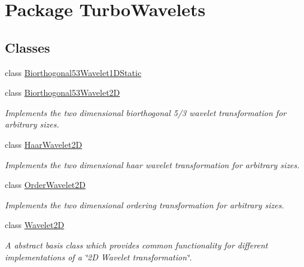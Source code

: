 \hypertarget{namespace_turbo_wavelets}{\section{\-Package \-Turbo\-Wavelets}
\label{namespace_turbo_wavelets}
}
\subsection*{\-Classes}
\begin{DoxyCompactItemize}
\item 
class \hyperlink{class_turbo_wavelets_1_1_biorthogonal53_wavelet1_d_static}{\-Biorthogonal53\-Wavelet1\-D\-Static}
\item 
class \hyperlink{class_turbo_wavelets_1_1_biorthogonal53_wavelet2_d}{\-Biorthogonal53\-Wavelet2\-D}
\begin{DoxyCompactList}\small\item\em \-Implements the two dimensional biorthogonal 5/3 wavelet transformation for arbitrary sizes. \end{DoxyCompactList}\item 
class \hyperlink{class_turbo_wavelets_1_1_haar_wavelet2_d}{\-Haar\-Wavelet2\-D}
\begin{DoxyCompactList}\small\item\em \-Implements the two dimensional haar wavelet transformation for arbitrary sizes. \end{DoxyCompactList}\item 
class \hyperlink{class_turbo_wavelets_1_1_order_wavelet2_d}{\-Order\-Wavelet2\-D}
\begin{DoxyCompactList}\small\item\em \-Implements the two dimensional ordering transformation for arbitrary sizes. \end{DoxyCompactList}\item 
class \hyperlink{class_turbo_wavelets_1_1_wavelet2_d}{\-Wavelet2\-D}
\begin{DoxyCompactList}\small\item\em \-A abstract basis class which provides common functionality for different implementations of a \char`\"{}2\-D Wavelet transformation\char`\"{}. \end{DoxyCompactList}\end{DoxyCompactItemize}
